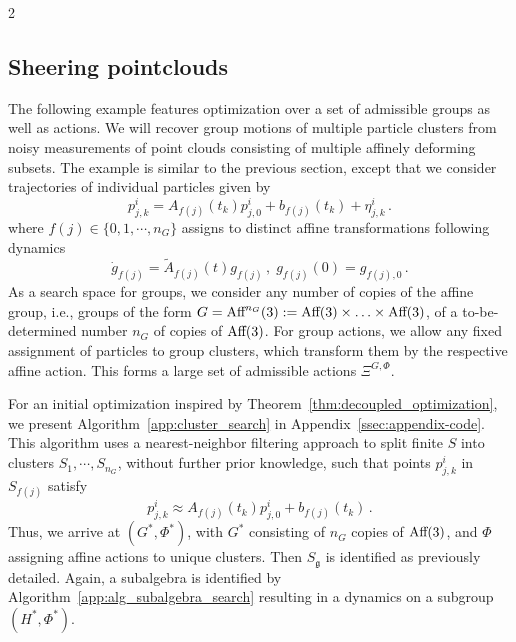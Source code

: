 \documentclass{article}
\newcommand{\g}{\mathfrak{g}}                               %
\newcommand{\R}{\mathbb{R}}                                 %
\begin{document}
\begin{multicols}{2}
\subsection{Sheering pointclouds}\label{ssec:sheering-pointclouds}
The following example features optimization over a set of admissible groups as well as actions. 
%
We will recover group motions of multiple particle clusters %
from noisy measurements of point clouds consisting of multiple affinely deforming subsets. The example is similar to the previous section, except that we consider trajectories of individual particles given by 
\begin{equation}
    p^i_{j,k} 
    = A_{f(j)}(t_k) p^i_{j,0} 
    + b_{f(j)}(t_k) + \eta^i_{j,k}\,.
\end{equation}  
where $f(j) \in \{0,1,\cdots, n_G\}$ assigns to distinct affine transformations following dynamics 
\begin{equation}
    \dot{g}_{f(j)} = \widetilde{A}_{f(j)}(t) g_{f(j)}\,,\; g_{f(j)}(0) = g_{f(j),0}\,.
\end{equation}
As a search space for groups, we consider any number of copies of the affine group, i.e., groups of the form $G = \textnormal{Aff}^{n_G}(3) := \textnormal{Aff}(3) \times \ldots \times \textnormal{Aff}(3)$, of a to-be-determined number $n_G$ of copies of $\textnormal{Aff}(3)$. For group actions, we allow any fixed assignment of particles to group clusters, which transform them by the respective affine action. This forms a large set of admissible actions $\Xi^{G,\Phi}$.

For an initial optimization inspired by Theorem~\ref{thm:decoupled_optimization}, we present Algorithm~\ref{app:cluster_search} in Appendix~\ref{ssec:appendix-code}. This algorithm uses a nearest-neighbor filtering approach to split finite $S$ into clusters $S_1,\cdots, S_{n_G}$, without further prior knowledge, such that points $p^i_{j,k}$ in $S_{f(j)}$ satisfy 
\begin{equation}
    p^i_{j,k} 
    \approx A_{f(j)}(t_k) p^i_{j,0} 
    + b_{f(j)}(t_k) \,.
\end{equation}
Thus, we arrive at $(G^*,\Phi^*)$, with $G^*$ consisting of $n_G$ copies of $\textnormal{Aff}(3)$, and $\Phi$ assigning affine actions to unique clusters. Then $S_\g$ is identified as previously detailed. Again, a subalgebra is identified by Algorithm~\ref{app:alg_subalgebra_search} resulting in a dynamics on a subgroup $(H^*,\Phi^*)$. %


\end{multicols}
\end{document}
